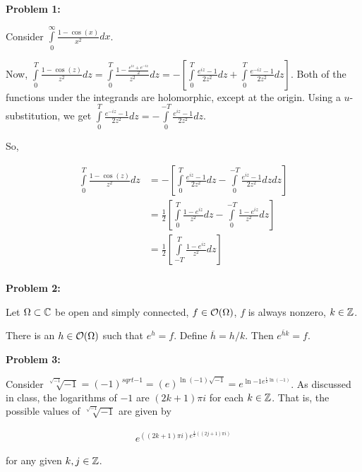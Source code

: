 \documentclass[a4paper,12pt]{article}
\begin{document}
{\bf Problem 1:}

Consider $\int\limits_0^\infty \frac{1-\cos(x)}{x^2} dx$. 

Now, $\int\limits_0^T\frac{1-\cos(z)}{z^2} dz = \int\limits_0^T\frac{1-\frac{e^{iz}+e^{-iz}}{2}}{z^2} dz = -\left[\int\limits_0^T \frac{e^{iz}-1}{2z^2} dz+ \int\limits_0^T \frac{e^{-iz}-1}{2z^2} dz\right]$. Both of the functions under the integrands are holomorphic, except at the origin. Using a $u$-substitution, we get $\int\limits_0^T \frac{e^{-iz}-1}{2z^2} dz = -\int\limits_0^{-T} \frac{e^{iz}-1}{2z^2} dz$.

So, 

\begin{align*}
\int\limits_0^T\frac{1-\cos(z)}{z^2} dz &= -\left[\int\limits_0^T \frac{e^{iz}-1}{2z^2} dz- \int\limits_0^{-T} \frac{e^{iz}-1}{2z^2} dz dz\right]\\
&= \frac{1}{2}\left[\int\limits_0^T \frac{1-e^{iz}}{z^2} dz-\int\limits_0^{-T} \frac{1-e^{iz}}{z^2} dz \right]\\
&= \frac{1}{2}\left[\int\limits_{-T}^T \frac{1-e^{iz}}{z^2} dz \right]\\
\end{align*} %

\shunt

{\bf Problem 2:}

Let $\Omega \subset \mathbb{C}$ be open and simply connected, $f \in \mathcal{O} (\Omega)$, $f$ is always nonzero, $k \in \mathbb{Z}$.

There is an $h \in \mathcal{O}(\Omega)$ such that $e^h =f$. Define $\overline{h} = h/k$. Then $e^{\overline{h}k} = f$. %

\shunt

{\bf Problem 3:}

Consider $\sqrt[\sqrt{-1}]{-1} = (-1)^{sqrt{-1}} = (e)^{\ln(-1)\sqrt{-1}} = e^{\ln{-1}e^{\frac{1}{2}\ln(-1)}}$. As discussed in class, the logarithms of $-1$ are $(2k+1)\pi i$ for each $k \in \mathbb{Z}$. That is, the possible values of $\sqrt[\sqrt{-1}]{-1}$ are given by 

\begin{align*}
e^{((2k+1)\pi i)e^{\frac{1}{2}((2j+1)\pi i)}} 
\end{align*} %

for any given $k, j \in \mathbb{Z}$.
\end{document}
